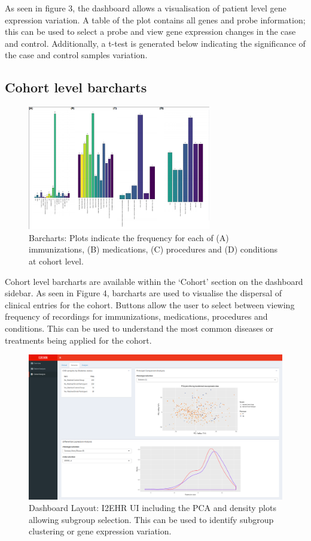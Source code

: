 \documentclass{bioinfo}
\begin{document}
As seen in figure 3, the dashboard allows a visualisation of patient level gene expression variation. A table of the plot contains all genes and probe information; this can be used to select a probe and view gene expression changes in the case and control. Additionally, a t-test is generated below indicating the significance of the case and control samples variation.


\subsection{Cohort level barcharts}
\begin{figure}[!h]
\center
\includegraphics[width=8cm]{barcharts.png}
\caption{Barcharts: Plots indicate the frequency for each of (A) immunizations, (B) medications, (C) procedures and (D) conditions at cohort level.} 
\end{figure}

Cohort level barcharts are available within the `Cohort' section on the dashboard sidebar.
As seen in Figure 4, barcharts are used to visualise the dispersal of clinical entries for the cohort. Buttons allow the user to select between viewing frequency of recordings for immunizations, medications, procedures and conditions. This can be used to understand the most common diseases or treatments being applied for the cohort.  


\begin{figure}[!t]
\center
\includegraphics[width=17cm]{DashboardLayout2.png}
\caption{Dashboard Layout: I2EHR UI including the PCA and density plots allowing subgroup selection. This can be used to identify subgroup clustering or gene expression variation.} 
\end{figure}
\end{document}
